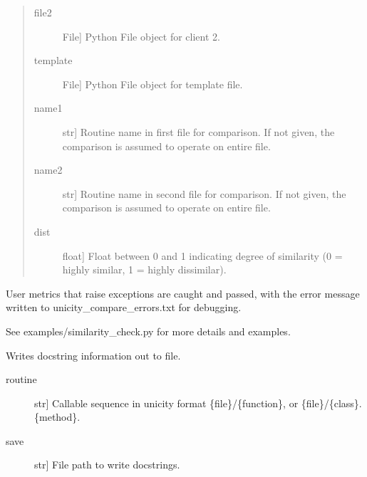 \documentclass[letterpaper,10pt,english]{sphinxmanual}
\begin{document}
\begin{fulllineitems}
\begin{fulllineitems}
\begin{quote}
\begin{description}
\item[{file2}] \leavevmode{[}File{]}
Python File object for client 2.

\item[{template}] \leavevmode{[}File{]}
Python File object for template file.

\item[{name1}] \leavevmode{[}str{]}
Routine name in first file for comparison. If not given, the comparison 
is assumed to operate on entire file.

\item[{name2}] \leavevmode{[}str{]}
Routine name in second file for comparison. If not given, the comparison 
is assumed to operate on entire file.

\end{description}
\begin{description}
\item[{dist}] \leavevmode{[}float{]}
Float between 0 and 1 indicating degree of similarity (0 = highly similar,
1 = highly dissimilar).

\end{description}
\end{quote}

User metrics that raise exceptions are caught and passed, with the error message written
to unicity\_compare\_errors.txt for debugging.

See examples/similarity\_check.py for more details and examples.

\end{fulllineitems}


\begin{fulllineitems}
\label{\detokenize{index:unicity.Project.dump_docstrings}}
Writes docstring information out to file.
\begin{description}
\item[{routine}] \leavevmode{[}str{]}
Callable sequence in unicity format \{file\}/\{function\}, or
\{file\}/\{class\}.\{method\}.

\item[{save}] \leavevmode{[}str{]}
File path to write docstrings.

\end{description}

\end{fulllineitems}


\end{fulllineitems}
\end{document}
